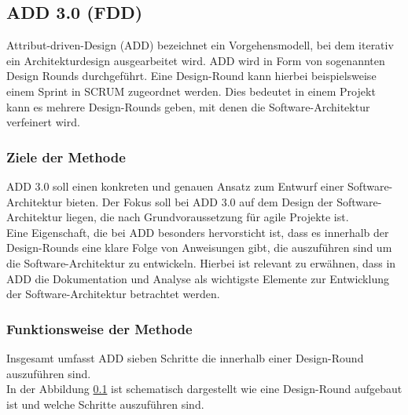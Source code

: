 \subsection{ADD 3.0 (FDD)}\label{add3}
Attribut-driven-Design (ADD) bezeichnet ein Vorgehensmodell, bei dem iterativ ein Architekturdesign ausgearbeitet wird. ADD wird in Form von sogenannten Design Rounds durchgeführt. Eine Design-Round kann hierbei beispielsweise einem Sprint in SCRUM zugeordnet werden. Dies bedeutet in einem Projekt kann es mehrere Design-Rounds geben, mit denen die Software-Architektur verfeinert wird. \\

\subsubsection{Ziele der Methode}
ADD 3.0 soll einen konkreten und genauen Ansatz zum Entwurf einer Software-Architektur bieten. Der Fokus soll bei ADD 3.0 auf dem Design der Software-Architektur liegen, die nach \cite{add} Grundvoraussetzung für agile Projekte ist.\\

Eine Eigenschaft, die bei ADD besonders hervorsticht ist, dass es innerhalb der Design-Rounds eine klare Folge von Anweisungen gibt, die auszuführen sind um die Software-Architektur zu entwickeln. Hierbei ist relevant zu erwähnen, dass in ADD die Dokumentation und Analyse als wichtigste Elemente zur Entwicklung der Software-Architektur betrachtet werden. \\

\subsubsection{Funktionsweise der Methode}
Insgesamt umfasst ADD sieben Schritte die innerhalb einer Design-Round auszuführen sind.\\

In der Abbildung \ref{add3} ist schematisch dargestellt wie eine Design-Round aufgebaut ist und welche Schritte auszuführen sind.

